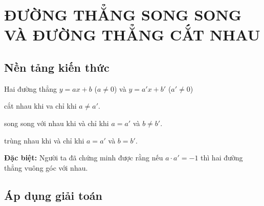\section{ĐƯỜNG THẲNG SONG SONG VÀ ĐƯỜNG THẲNG CẮT NHAU}

\subsection{Nền tảng kiến thức}
Hai đường thẳng $y=ax+b$ ($a\neq 0$) và $y=a'x+b'$ ($a'\neq 0$)
\begin{enumEX}{1}
	\item cắt nhau khi va chỉ khi $a\neq a'$.
	\item song song với nhau khi và chỉ khi $a=a'$ và $b\neq b'$.
	\item trùng nhau khi và chỉ khi $a=a'$ và $b=b'$.
	\end{enumEX}
\textbf{Đặc biệt: } Người ta đã chứng minh được rằng nếu $a\cdot a'=-1$ thì hai đường thẳng vuông góc với nhau.
\subsection{Áp dụng giải toán}

